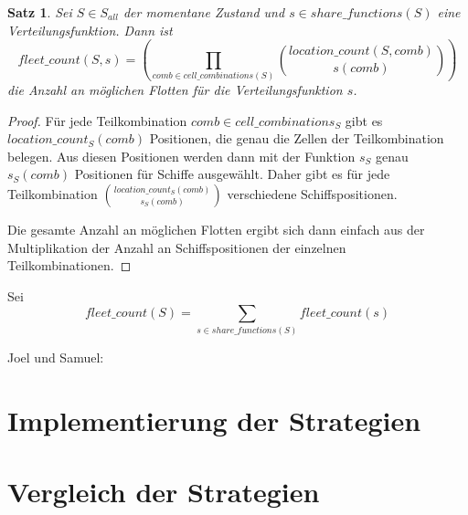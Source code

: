 \documentclass[a4paper,12pt]{llncs}
\numberwithin{equation}{section}
\newtheorem{satz}{Satz}
\begin{document}
\begin{satz}
Sei $S\in S_{all}$ der momentane Zustand und $s \in share\_functions(S)$ eine Verteilungsfunktion.
Dann ist
\[
fleet\_count(S, s)=
\left( \prod_{comb \in cell\_combinations(S)}{{location\_count(S, comb)\choose s(comb)}} \right)
\]
die Anzahl an möglichen Flotten für die Verteilungsfunktion $s$.
\end{satz}

\begin{proof}
Für jede Teilkombination $comb \in cell\_combinations_S$ gibt es $location\_count_S(comb)$ Positionen, die genau die Zellen der Teilkombination belegen. Aus diesen Positionen werden dann mit der Funktion $s_S$ genau $s_S(comb)$ Positionen für Schiffe ausgewählt. Daher gibt es für jede Teilkombination ${location\_count_S(comb)\choose s_S(comb)}$ verschiedene Schiffspositionen.

Die gesamte Anzahl an möglichen Flotten ergibt sich dann einfach aus der Multiplikation der Anzahl an Schiffspositionen der einzelnen Teilkombinationen.
\end{proof}

\begin{definition}
Sei
\[
fleet\_count(S)=\sum_{s \in share\_functions(S)}{fleet\_count(s)}
\]
\end{definition}

Joel und Samuel:

\section{Implementierung der Strategien}

\section{Vergleich der Strategien}


\newpage

 

\end{document}
